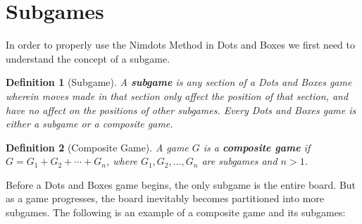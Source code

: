 \documentclass[12pt,twoside]{reedthesis}
\newtheorem{mydef}{Definition}
\begin{document}
\section{Subgames}
In order to properly use the Nimdots Method in Dots and Boxes we first need to understand the concept of a subgame.

\begin{mydef}[Subgame]
A \textbf{subgame} is any section of a Dots and Boxes game wherein moves made in that section only affect the position of that section, and have no affect on the positions of other subgames.  Every Dots and Boxes game is either a subgame or a composite game. 
\end{mydef}

\begin{mydef}[Composite Game]
A game $G$ is a \textbf{composite game} if  \newline $G = G_1 + G_2 + \cdots + G_n$, where $G_1 , G_2 , \dots , G_n$ are subgames and $n>1$.
\end{mydef}

Before a Dots and Boxes game begins, the only subgame is the entire board.  But as a game progresses, the board inevitably  becomes partitioned into more subgames.  The following is an example of a composite game and its subgames:
\end{document}
